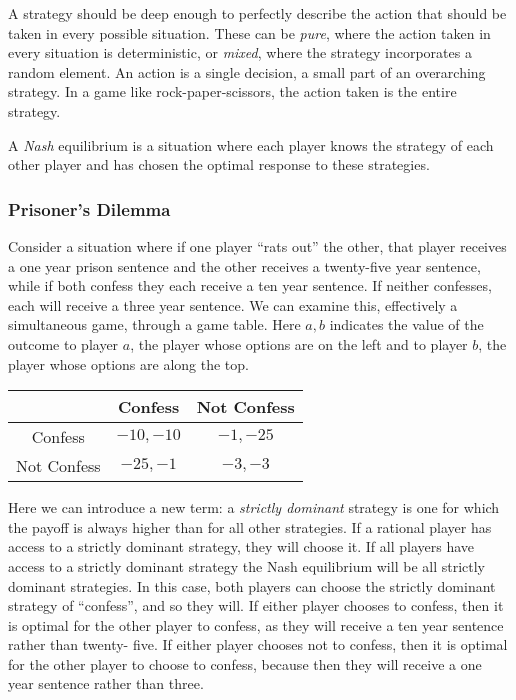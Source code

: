 \documentclass[12pt]{report}
\begin{document}
\begin{flushleft}
\bigskip
A strategy should be deep enough to perfectly describe the action that should
be taken in every possible situation. These can be \textit{pure}, where the
action taken in every situation is deterministic, or \textit{mixed}, where the
strategy incorporates a random element. An action is a single decision, a small
part of an overarching strategy. In a game like rock-paper-scissors, the action
taken is the entire strategy.

\bigskip
A \textit{Nash} equilibrium is a situation where each player knows the strategy
of each other player and has chosen the optimal response to these strategies.

\subsubsection*{Prisoner's Dilemma}
Consider a situation where if one player ``rats out'' the other, that player
receives a one year prison sentence and the other receives a twenty-five year
sentence, while if both confess they each receive a ten year sentence. If 
neither confesses, each will receive a three year sentence. We can examine 
this, effectively a simultaneous game, through a game table. Here 
\(a, b\) indicates the value of the outcome to player \(a\), the player whose
options are on the left and to player \(b\), the player whose options are along
the top.

\begin{center}
    \begin{tabular}{c|c|c}
        & Confess & Not Confess \\
        \hline
        Confess & \(-10, -10\) & \(-1, -25\)\\
        Not Confess & \(-25, -1\) & \(-3, -3\) \\ 
    \end{tabular}
\end{center}

Here we can introduce a new term: a \textit{strictly dominant} strategy is one
for which the payoff is always higher than for all other strategies. If a 
rational player has access to a strictly dominant strategy, they will choose 
it. If all players have access to a strictly dominant strategy the Nash 
equilibrium will be all strictly dominant strategies. In this case, both 
players can choose the strictly dominant strategy of ``confess'', and so they
will. If either player chooses to confess, then it is optimal for the other
player to confess, as they will receive a ten year sentence rather than twenty-
five. If either player chooses not to confess, then it is optimal for the other
player to choose to confess, because then they will receive a one year sentence
rather than three.

\end{flushleft}
\end{document}
